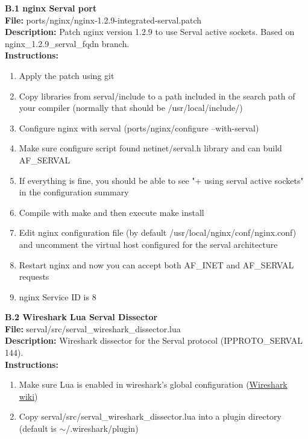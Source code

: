 \documentclass[12pt,a4paper,oneside]{article}
\begin{document}
\newpage
{}
{}
\label{sec:nginxport}
{\huge \bf \noindent B.1 nginx Serval port}\\[0.5cm]
\textbf{File:} ports/nginx/nginx-1.2.9-integrated-serval.patch\\
\textbf{Description:} Patch nginx version 1.2.9 to use Serval active sockets. Based on nginx\_1.2.9\_serval\_fqdn branch.\\
\textbf{Instructions: }
\begin{enumerate} \itemsep1pt \parskip0pt 
	\item Apply the patch using git
	\item Copy libraries from serval/include to a path included in the search path of your compiler (normally that should be /usr/local/include/)
	\item Configure nginx with serval (ports/nginx/configure --with-serval)
	\item Make sure configure script found netinet/serval.h library and can build AF\_SERVAL
	\item If everything is fine, you should be able to see "+ using serval active sockets" in the configuration summary
	\item Compile with make and then execute make install
	\item Edit nginx configuration file (by default /usr/local/nginx/conf/nginx.conf) and uncomment the virtual host configured for the serval architecture
	\item Restart nginx and now you can accept both AF\_INET and AF\_SERVAL requests
	\item nginx Service ID is 8\\[0.5cm]
\end{enumerate}


\newpage
{}
{}
{\huge \bf \noindent B.2 Wireshark Lua Serval Dissector}\\[0.5cm]
\textbf{File:} serval/src/serval\_wireshark\_dissector.lua\\
\textbf{Description:} Wireshark dissector for the Serval protocol (IPPROTO\_SERVAL 144).\\
\textbf{Instructions: }
\begin{enumerate} \itemsep1pt \parskip0pt 
	\item Make sure Lua is enabled in wireshark's global configuration (\href{http://wiki.wireshark.org/Lua}{Wireshark wiki})
	\item Copy serval/src/serval\_wireshark\_dissector.lua into a plugin directory (default is $\sim$/.wireshark/plugin)\\[0.5cm]
\end{enumerate}

\end{document}
